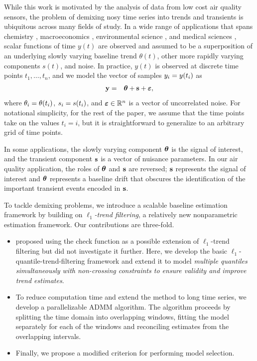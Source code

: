\documentclass[aoas]{imsart}
\newcommand{\Real}{\mathbb{R}}
\newcommand{\V}[1]{{\bm{\mathbf{\MakeLowercase{#1}}}}} %
\newcommand{\VE}[2]{\MakeLowercase{#1}_{#2}} %
\begin{document}
While this work is motivated by the analysis of data from low cost air quality sensors, the problem of demixing nosy time series into trends and transients is ubiquitous across many fields of study. In a wide range of applications that spans chemistry \citep{Ning2014}, macroeconomics \citep{yamada2017estimating}, environmental science \citep{brantley2014mobile}, and medical sciences \citep{pettersson2013algorithm, marandi2015qualitative}, scalar functions of time $y(t)$ are observed and assumed to be a superposition of an underlying slowly varying baseline trend $\theta(t)$, other more rapidly varying components $s(t)$, and noise. In practice, $y(t)$ is observed at discrete time points $t_1, \ldots, t_n$, and we model the vector of samples $\VE{y}{i} = y(t_i)$ as
\begin{eqnarray*}
	\V{y} & = & \V{\theta} + \V{s} + \V{\varepsilon},
\end{eqnarray*}
where $\VE{\theta}{i} = \theta(t_i)$, $\VE{s}{i} = s(t_i)$, and $\V{\varepsilon} \in \Real^n$ is a vector of uncorrelated noise. For notational simplicity, for the rest of the paper, we assume that the time points take on the values $t_i = i$, but it is straightforward to generalize to an arbitrary grid of time points.

In some applications, the slowly varying component $\V{\theta}$ is the signal of interest, and the transient component $\V{s}$ is a vector of nuisance parameters. In our air quality application, the roles of $\V{\theta}$ and $\V{s}$ are reversed; $\V{s}$ represents the signal of interest and $\V{\theta}$ represents a baseline drift that obscures the identification of the important transient events encoded in $\V{s}$. 

To tackle demixing problems, we introduce a scalable baseline estimation framework by building on \textit{$\ell_1$-trend filtering}, a relatively new nonparametric estimation framework. Our contributions are three-fold.
\begin{itemize}
	\item \cite{Kim2009} proposed using the check function as a possible extension of $\ell_1$-trend filtering but did not investigate it further. Here, we develop the basic $\ell_1$-quantile-trend-filtering framework and extend it to model {\em multiple quantiles simultaneously with non-crossing constraints to ensure validity and improve trend estimates}.
	\item To reduce computation time and extend the method to long time series, we develop a parallelizable ADMM algorithm. The algorithm proceeds by splitting the time domain into overlapping windows, fitting the model separately for each of the windows and reconciling estimates from the overlapping intervals.
	\item Finally, we propose a modified criterion for performing model selection.
\end{itemize}
\end{document}
